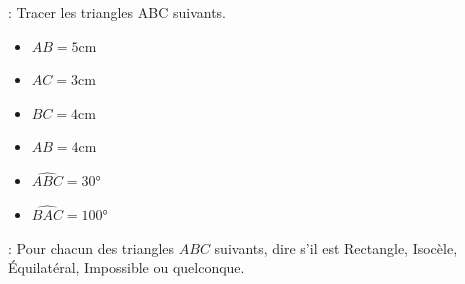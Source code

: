  : Tracer les triangles ABC suivants.

\begin{minipage}{0.45\textwidth}
    \begin{itemize}
        \item $AB=5$cm
        \item $AC=3$cm
        \item $BC=4$cm
    \end{itemize}
    \vspace*{10cm}
\end{minipage}
\hfil
\vrule
\hfil
\begin{minipage}{0.45\textwidth}
    \begin{itemize}
        \item $AB=4$cm
        \item $\widehat{ABC}=30$°
        \item $\widehat{BAC}=100$°
    \end{itemize}
    \vspace*{10cm}
\end{minipage}


 : Pour chacun des triangles $ABC$ suivants, dire s'il est Rectangle, Isocèle, Équilatéral, Impossible ou quelconque.

